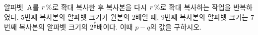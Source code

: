 알파벳~$\mathrm{A}$를 $r\mkern3mu \%$로 확대 복사한 후 복사본을 다시 $r\mkern3mu \%$로 확대 복사하는 작업을 반복하였다. $5$번째 복사본의 알파벳 크기가 원본의 $2$배일 때, $9$번째 복사본의 알파벳 크기는 $7$번째 복사본의 알파벳 크기의 $2^{\frac{q}{p}}$배이다. 이때 $p-q$의 값을 구하시오. 
